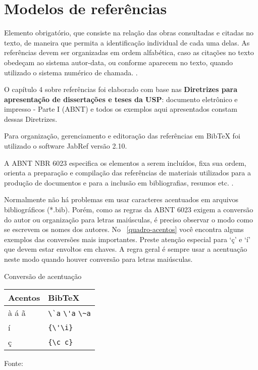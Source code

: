 

\chapter{Modelos de referências}
\label{Referências}
Elemento obrigatório, que consiste na relação das obras consultadas e citadas no texto, de maneira que permita a identificação individual de cada uma delas. As referências devem ser organizadas em ordem alfabética, caso as citações no texto obedeçam ao sistema autor-data, ou conforme aparecem no texto, quando utilizado o sistema numérico de chamada. \cite{sibi2009}.

O capítulo 4 sobre referências foi elaborado com base nas \textbf{Diretrizes para apresentação de dissertações e teses da USP}: documento eletrônico e impresso - Parte I (ABNT) e todos os exemplos aqui apresentados constam dessas Diretrizes.  

Para organização, gerenciamento e editoração das referências em BibTeX foi utilizado o software JabRef versão 2.10.

A ABNT NBR 6023 especifica os elementos a serem incluídos, fixa sua ordem, orienta a preparação e compilação das referências de materiais utilizados para a produção de documentos e para a inclusão em bibliografias, resumos etc. \cite{nbr6023}.

Normalmente não há problemas em usar caracteres acentuados em arquivos bibliográficos {(*.bib)}. Porém, como as regras da ABNT 6023 exigem a conversão do autor ou organização para letras maiúsculas, é preciso observar o modo como se escrevem os nomes dos autores. No ~\autoref{quadro-acentos} você encontra alguns
exemplos das conversões mais importantes. Preste atenção especial para `ç' e `í'
que devem estar envoltos em chaves. A regra geral é sempre usar a acentuação neste modo quando houver conversão para letras maiúsculas. \cite{abnetxcite} \\

\begin{quadro}[H]
	\caption{\label{quadro-acentos}Conversão de acentuação}
		\begin{tabular}{|p{7.5cm}|p{7.5cm}|}
			\hline
			\textbf{Acentos} & \textbf{BibTeX}\\
			\hline
			à á ã & \verb+\`a+ \verb+\'a+ \verb+\~a+\\
			\hline
			í & \verb+{\'\i}+\\
			\hline
			ç & \verb+{\c c}+\\
			\hline
		\end{tabular}
		\begin{flushleft}
			Fonte: 
		\end{flushleft}	
\end{quadro}



